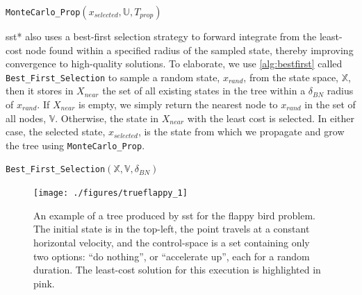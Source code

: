 \begin{algorithm}
\caption{\texttt{MonteCarlo\_Prop}$(x_{selected}, \mathbb{U}, T_{prop})$}
\label{alg:montecarlo}
\begin{algorithmic}[1]
\end{algorithmic}{}
\end{algorithm}


\gls{sst}* also uses a best-first selection strategy to forward integrate from the least-cost node found within a specified radius of the sampled state, thereby improving convergence to high-quality solutions. To elaborate, we use \autoref{alg:bestfirst} called \texttt{Best\_First\_Selection} to sample a random state, $x_{rand}$, from the state space, $\mathbb{X}$, then it stores in $X_{near}$ the set of all existing states in the tree within a $\delta_{BN}$ radius of $x_{rand}$. If $X_{near}$ is empty, we simply return the nearest node to $x_{rand}$ in the set of all nodes, $\mathbb{V}$. Otherwise, the state in $X_{near}$ with the least cost is selected. In either case, the selected state, $x_{selected}$, is the state from which we propagate and grow the tree using \texttt{MonteCarlo\_Prop}.

\begin{algorithm}
\caption{\texttt{Best\_First\_Selection}$(\mathbb{X}, \mathbb{V}, \delta_{BN})$}
\label{alg:bestfirst}
\begin{algorithmic}[1]
    \Else{}
    \EndIf{}
\end{algorithmic}{}
\end{algorithm}



\begin{figure}[!ht]
    \centering
    \texttt{[image: ./figures/trueflappy\_1]}
    \caption[SST Flappy Bird Example]{An example of a tree produced by \gls{sst} for the flappy bird problem. The initial state is in the top-left, the point travels at a constant horizontal velocity, and the control-space is a set containing only two options: ``do nothing'', or ``accelerate up'', each for a random duration. The least-cost solution for this execution is highlighted in pink.}
\label{fig:flappy}
\end{figure}

